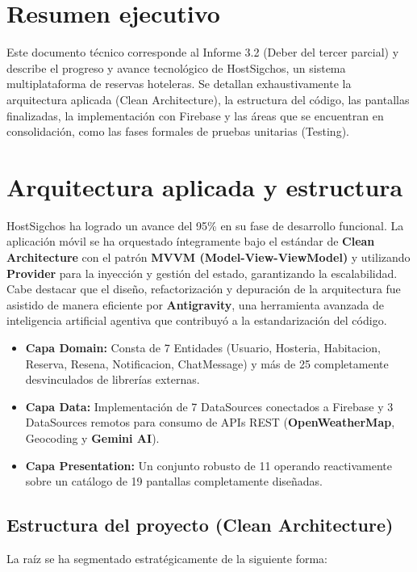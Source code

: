 \documentclass[12pt,letterpaper]{report}
\newcommand{\tech}[1]{\textbf{\textcolor{sigchosDarkGreen}{#1}}}
\newcommand{\pathtext}[1]{\texttt{\detokenize{#1}}}
\begin{document}
\tableofcontents
\clearpage
{}

\chapter*{Resumen ejecutivo}
Este documento técnico corresponde al Informe 3.2 (Deber del tercer parcial) y describe el progreso y avance tecnológico de HostSigchos, un sistema multiplataforma de reservas hoteleras. Se detallan exhaustivamente la arquitectura aplicada (Clean Architecture), la estructura del código, las pantallas finalizadas, la implementación con Firebase y las áreas que se encuentran en consolidación, como las fases formales de pruebas unitarias (Testing).

\chapter{Arquitectura aplicada y estructura}

HostSigchos ha logrado un avance del 95\% en su fase de desarrollo funcional. La aplicación móvil se ha orquestado íntegramente bajo el estándar de \tech{Clean Architecture} con el patrón \tech{MVVM (Model-View-ViewModel)} y utilizando \tech{Provider} para la inyección y gestión del estado, garantizando la escalabilidad. Cabe destacar que el diseño, refactorización y depuración de la arquitectura fue asistido de manera eficiente por \textbf{Antigravity}, una herramienta avanzada de inteligencia artificial agentiva que contribuyó a la estandarización del código.

\begin{itemize}[label=\color{sigchosDarkGreen}$\blacksquare$]
    \item \textbf{Capa Domain:} Consta de 7 Entidades (Usuario, Hosteria, Habitacion, Reserva, Resena, Notificacion, ChatMessage) y más de 25 \pathtext{UseCases} completamente desvinculados de librerías externas.
    \item \textbf{Capa Data:} Implementación de 7 DataSources conectados a Firebase y 3 DataSources remotos para consumo de APIs REST (\tech{OpenWeatherMap}, Geocoding y \tech{Gemini AI}).
    \item \textbf{Capa Presentation:} Un conjunto robusto de 11 \pathtext{ViewModels} operando reactivamente sobre un catálogo de 19 pantallas completamente diseñadas.
\end{itemize}

\section{Estructura del proyecto (Clean Architecture)}
La raíz \pathtext{lib/} se ha segmentado estratégicamente de la siguiente forma:
\end{document}
